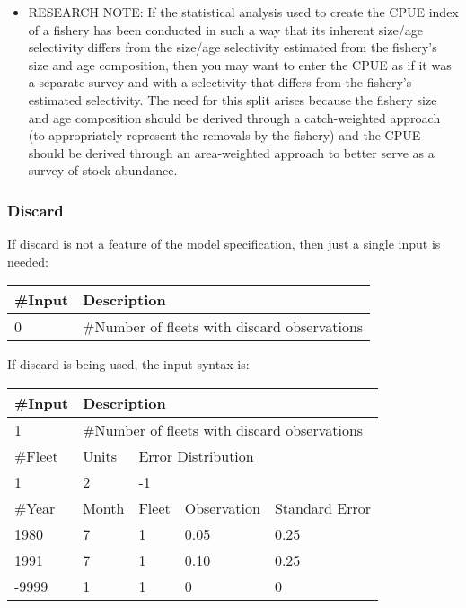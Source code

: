 \begin{description}
\begin{itemize}
		\item RESEARCH NOTE:  If the statistical analysis used to create the CPUE index of a fishery has been conducted in such a way that its inherent size/age selectivity differs from the size/age selectivity estimated from the fishery’s size and age composition, then you may want to enter the CPUE as if it was a separate survey and with a selectivity that differs from the fishery’s estimated selectivity.  The need for this split arises because the fishery size and age composition should be derived through a catch-weighted approach (to appropriately represent the removals by the fishery) and the CPUE should be derived through an area-weighted approach to better serve as a survey of stock abundance.
	\end{itemize}
\end{description}

\subsubsection{Discard}
If discard is not a feature of the model specification, then just a single input is needed:

\begin{center}
\begin{tabular}{p{2cm} p{13cm}}
	\#Input & Description\\
	\hline
	0 & \#Number of fleets with discard observations\\
	\hline
\end{tabular}
\end{center}

	
\noindent	
If discard is being used, the input syntax is:
	\begin{center}
		\begin{tabular}{p{2cm} p{3cm} p{3cm} p{3cm} p{3cm}}
			\#Input & \multicolumn{4}{l}{Description}\\
			\hline
			1 & \multicolumn{4}{l}{\#Number of fleets with discard observations}\\
			\hline
			\#Fleet & Units & \multicolumn{3}{l}{Error Distribution}\\
			\hline
			1 & 2 & \multicolumn{3}{l}{-1}\\
			\hline
			\#Year & Month & Fleet  & Observation & Standard Error \\
			\hline
			1980  & 7 & 1 & 0.05 & 0.25 \\
			1991  & 7 & 1 & 0.10 & 0.25 \\
			-9999 & 1 & 1 & 0    & 0 \\
			\hline
		\end{tabular}
	\end{center}
	
